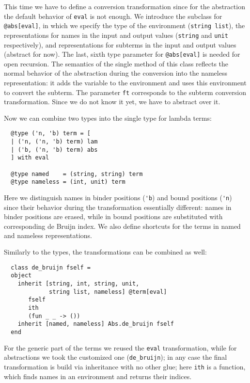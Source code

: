 This time we have to define a conversion transformation since for the abstraction the default behavior of \lstinline{eval} is not
enough. We introduce the subclass for \lstinline{@abs[eval]}, in which we specify the type of the environment (\lstinline{string list}),
the representations for names in the input and output values (\lstinline{string} and \lstinline{unit} respectively), and
representations for subterms in the input and output values (abstract for now). The last, sixth type parameter for \lstinline{@abs[eval]}
is needed for open recursion. The semantics of the single method of this class reflects the normal behavior of the
abstraction during the conversion into the nameless representation: it adds the variable to the environment and uses this
environment to convert the subterm. The parameter \lstinline{ft} corresponds to the subterm conversion transformation. Since
we do not know it yet, we have to abstract over it.

Now we can combine two types into the single type for lambda terms:

\begin{lstlisting}
  @type ('n, 'b) term = [
  | ('n, ('n, 'b) term) lam
  | ('b, ('n, 'b) term) abs
  ] with eval

  @type named    = (string, string) term
  @type nameless = (int, unit) term
\end{lstlisting}

Here we distinguish names in binder positions (\lstinline{'b}) and bound positions (\lstinline{'n}) since their behavior during the
transformation essentially different: names in binder positions are erased, while in bound positions are substituted with corresponding
de Bruijn index. We also define shortcuts for the terms in named and nameless representations.

Similarly to the types, the transformations can be combined as well:

\begin{lstlisting}
  class de_bruijn fself =
  object
    inherit [string, int, string, unit,
             string list, nameless] @term[eval]
       fself
       ith
       (fun _ _ -> ())
    inherit [named, nameless] Abs.de_bruijn fself
  end
\end{lstlisting}

For the generic part of the terms we reused the \lstinline{eval} transformation, while for abstractions we took the customized one (\lstinline{de_bruijn}); in
any case the final transformation is build via inheritance with no other glue; here \lstinline{ith} is a function, which finds names in an
environment and returns their indices.

